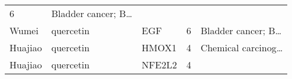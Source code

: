 \documentclass[
]{article}
\begin{document}
\begin{longtable}[]{@{}lllll@{}}
\begin{minipage}[t]{0.19\columnwidth}
6\strut
\end{minipage} & \begin{minipage}[t]{0.21\columnwidth}\raggedright
Bladder cancer; B\ldots{}\strut
\end{minipage}\tabularnewline
\begin{minipage}[t]{0.17\columnwidth}\raggedright
Wumei\strut
\end{minipage} & \begin{minipage}[t]{0.16\columnwidth}\raggedright
quercetin\strut
\end{minipage} & \begin{minipage}[t]{0.12\columnwidth}\raggedright
EGF\strut
\end{minipage} & \begin{minipage}[t]{0.19\columnwidth}\raggedright
6\strut
\end{minipage} & \begin{minipage}[t]{0.21\columnwidth}\raggedright
Bladder cancer; B\ldots{}\strut
\end{minipage}\tabularnewline
\begin{minipage}[t]{0.17\columnwidth}\raggedright
Huajiao\strut
\end{minipage} & \begin{minipage}[t]{0.16\columnwidth}\raggedright
quercetin\strut
\end{minipage} & \begin{minipage}[t]{0.12\columnwidth}\raggedright
HMOX1\strut
\end{minipage} & \begin{minipage}[t]{0.19\columnwidth}\raggedright
4\strut
\end{minipage} & \begin{minipage}[t]{0.21\columnwidth}\raggedright
Chemical carcinog\ldots{}\strut
\end{minipage}\tabularnewline
\begin{minipage}[t]{0.17\columnwidth}\raggedright
Huajiao\strut
\end{minipage} & \begin{minipage}[t]{0.16\columnwidth}\raggedright
quercetin\strut
\end{minipage} & \begin{minipage}[t]{0.12\columnwidth}\raggedright
NFE2L2\strut
\end{minipage} & \begin{minipage}[t]{0.19\columnwidth}\raggedright
4\strut
\end{minipage} & \begin{minipage}[t]{0.21\columnwidth}\raggedright

\end{minipage}
\end{longtable}
\end{document}
